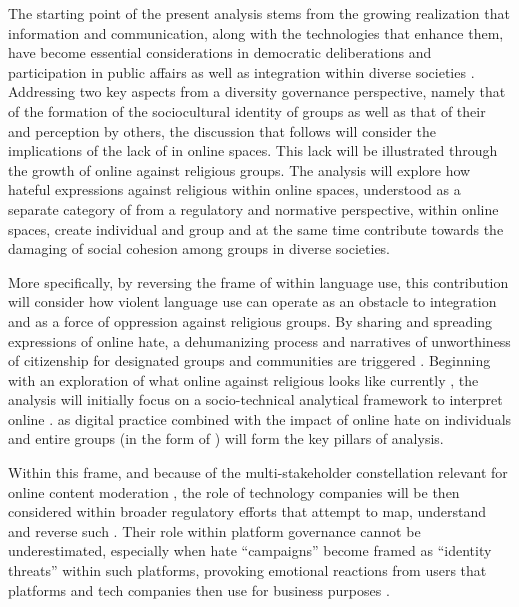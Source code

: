 \documentclass[output=paper,colorlinks,citecolor=brown]{langscibook}
\begin{document}
The starting point of the present analysis stems from the growing realization that information and communication, along with the technologies that enhance them, have become essential considerations in democratic deliberations \citep{szakacs_bognar2021} and participation in public affairs as well as integration within diverse societies \citep{uk_law_commission2018}. Addressing two key aspects from a diversity governance  perspective, namely that of the formation of the sociocultural identity of  groups as well as that of their  and perception by others, the discussion that follows will consider the implications of the lack of  in online spaces. This lack will be illustrated through the growth of online  against religious  groups. The analysis will explore how hateful expressions against religious  within online spaces, understood as a separate category of  from a regulatory and normative perspective, within online spaces, create individual and group  and at the same time contribute towards the damaging of social cohesion among groups in diverse societies.  

More specifically, by reversing the frame of  within language use, this contribution will consider how violent language use can operate as an obstacle to integration and as a force of oppression against religious  groups. By sharing and spreading expressions of online hate, a dehumanizing process and narratives of unworthiness of citizenship for designated groups and communities are triggered \citep{oboler2013,awan_zempi2020}. Beginning with an exploration of what online  against religious  looks like currently \citep{allen2015,aguilera-carnero_azeez2016}, the analysis will initially focus on a socio-technical analytical framework to interpret online .  as digital practice combined with the impact of online hate on individuals and entire groups (in the form of ) will form the key pillars of analysis. 

Within this frame, and because of the multi-stakeholder constellation relevant for online content moderation \citep{brown2020}, the role of technology companies will be then considered within broader regulatory efforts that attempt to map, understand and reverse such  \citep{chetty_altathur2018}. Their role within platform governance cannot be underestimated, especially when hate ``campaigns'' become framed as ``identity threats'' within such platforms, provoking emotional reactions from users that platforms and tech companies then use for business purposes \citep{hoffmann2019}. 
\end{document}
